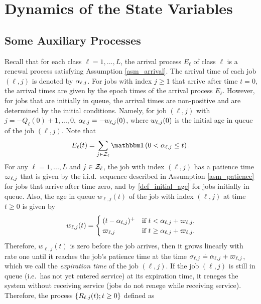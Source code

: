 \documentclass{article}
\theoremstyle{definition}
\numberwithin{equation}{section}
\begin{document}
\section{Dynamics of the State Variables}



\subsection{Some Auxiliary Processes}

Recall that for each class $\ell=1,...,L$, the arrival process $E_\ell$ of class $\ell$ is a renewal process satisfying Assumption \ref{asm_arrival}. The arrival time of each job $(\ell,j)$ is denoted by $\alpha_{\ell,j}$. For jobs with index $j\geq1$ that arrive after time $t=0$, the arrival times are given by the epoch times of the arrival process $E_\ell$. However, for jobs  that are initially in queue, the arrival times are non-positive and are determined by the initial conditions. Namely, for job $(\ell,j)$ with $j=-Q_\ell(0)+1,...,0$, $\alpha_{\ell,j}=-w_{\ell,j}(0)$, where $w_{\ell,j}(0)$ is the initial age in queue of the job $(\ell,j)$. Note that
\begin{equation}\label{arrival_rep}
\arrival_\ell(t)=\sum_{j\in\indexSet_\ell}\indic{0<\arrivaltime_{\ell,j}\leq t}.
\end{equation}
For any $\ell=1,...,L$ and $j\in\mathcal{Z}_\ell$, the job with index $(\ell,j)$ has a patience time $\varpi_{\ell,j}$ that is given by the i.i.d.\ sequence described in Assumption \ref{asm_patience} for jobs that arrive after time zero, and by \eqref{def_initial_age} for jobs initially in queue. Also, the age in queue $w_{\ell,j}(t)$ of the job with index $(\ell,j)$ at time $t\geq0$ is given by
\begin{equation}\label{def_w}
w_{\ell,j}(t)=
  \begin{cases} (t-\alpha_{\ell,j})^+ & \text{if }  t<\alpha_{\ell,j}+\varpi_{\ell,j},\\
  \varpi_{\ell,j}& \text{if }t\geq \alpha_{\ell,j}+\varpi_{\ell,j}.
  \end{cases}
\end{equation}
Therefore, $w_{\ell,j}(t)$ is zero before the job arrives, then it grows linearly with rate one until it reaches the job's patience time at the time $\sigma_{\ell,j}\doteq\alpha_{\ell,j}+\varpi_{\ell,j}$, which we call the \textit{expiration time} of the job $(\ell,j)$. If the job $(\ell,j)$ is still in queue (i.e.\ has not yet entered service) at its expiration time, it reneges the system without receiving service (jobs do not renege while receiving service). Therefore, the process $\{R_{\ell,j}(t);t\geq0\}$ defined as
\end{document}
